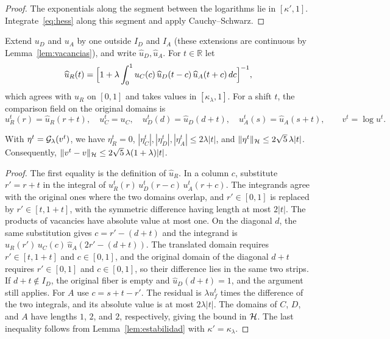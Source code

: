 \begin{proof} The exponentials along the segment between the logarithms lie in $[\kappa',1]$. Integrate~\eqref{eq:hess} along this
segment and apply Cauchy--Schwarz. \end{proof}

Extend $u_D$ and $u_A$ by one outside $I_D$ and $I_A$ (these extensions are continuous by Lemma~\ref{lem:vacancias}), and write
$\widehat u_D,\widehat u_A$. For $t\in\mathbb R$ let \[
 \widehat u_R(t)=\Bigl[1+\lambda\int_0^1u_C(c)\,\widehat u_D(t-c)\,\widehat u_A(t+c)\,dc\Bigr]^{-1},
\] which agrees with $u_R$ on $[0,1]$ and takes values in $[\kappa_\lambda,1]$. For a shift $t$, the comparison field on the original domains is \[
 u_R^t(r)=\widehat u_R(r+t),\quad u_C^t=u_C,\quad u_D^t(d)=\widehat u_D(d+t),\quad
 u_A^t(s)=\widehat u_A(s+t),\qquad v^t=\log u^t .
\]

\begin{lema}\label{lem:residuo} With $\eta^t={\mathcal{G}}_\lambda(v^t)$, we have $\eta^t_R=0$,
$|\eta^t_C|,|\eta^t_D|,|\eta^t_A|\le2\lambda|t|$, and $\|\eta^t\|_{\mathcal{H}}\le2\sqrt5\,\lambda|t|$. Consequently,
$\|v^t-v\|_{\mathcal{H}}\le2\sqrt5\,\lambda(1+\lambda)|t|$. \end{lema}

\begin{proof} The first equality is the definition of $\widehat u_R$. In a column $c$, substitute $r'=r+t$ in the integral of
$u_R^t(r)\,u_D^t(r-c)\,u_A^t(r+c)$. The integrands agree with the original ones where the two domains overlap, and $r'\in[0,1]$ is
replaced by $r'\in[t,1+t]$, with the symmetric difference having length at most $2|t|$. The products of vacancies have absolute value
at most one. On the diagonal $d$, the same substitution gives $c=r'-(d+t)$ and the integrand is $\widehat u_R(r')\,u_C(c)\,\widehat
u_A(2r'-(d+t))$. The translated domain requires $r'\in[t,1+t]$ and $c\in[0,1]$, and the original domain of the diagonal $d+t$ requires
$r'\in[0,1]$ and $c\in[0,1]$, so their difference lies in the same two strips. If $d+t\notin I_D$, the original fiber is empty and
$\widehat u_D(d+t)=1$, and the argument still applies. For $A$ use $c=s+t-r'$. The residual is $\lambda u^t_f$ times the difference of
the two integrals, and its absolute value is at most $2\lambda|t|$. The domains of $C$, $D$, and $A$ have lengths $1$, $2$, and $2$,
respectively, giving the bound in ${\mathcal{H}}$. The last inequality follows from Lemma~\ref{lem:estabilidad} with $\kappa'=\kappa_\lambda$.
\end{proof}

